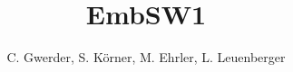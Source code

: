 \documentclass[titlepage=true]{scrartcl}
\title{EmbSW1}
\author{C. Gwerder, S. Körner, M. Ehrler, L. Leuenberger}
\begin{document}
\begin{titlepage}
   \thispagestyle{empty}
   \maketitle
\end{titlepage}


\lstset{style=C}
\setcounter{tocdepth}{2}
\tableofcontents \newpage















\end{document}

